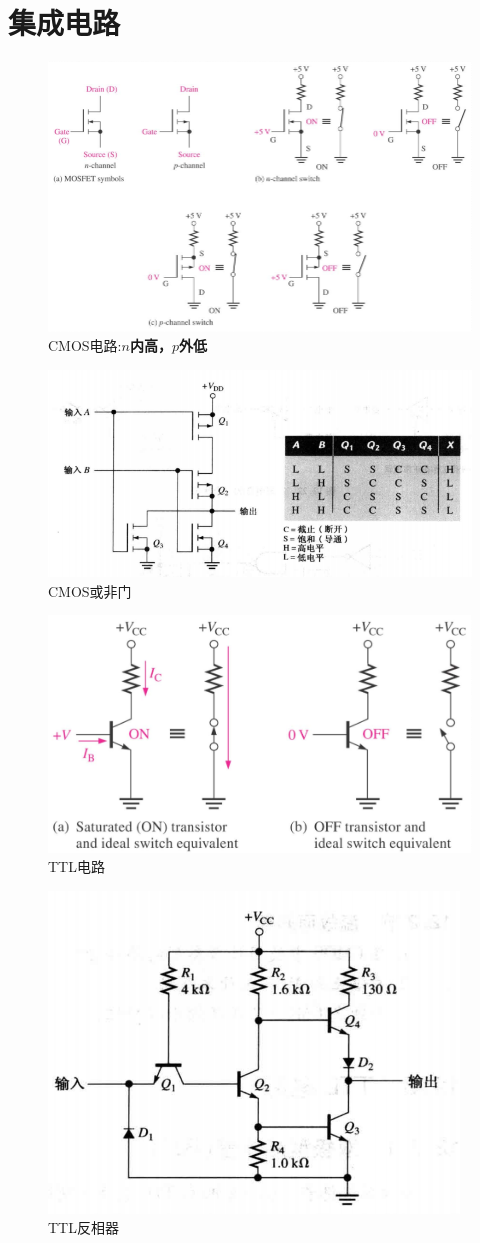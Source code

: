 \section{集成电路}
\begin{figure}[htbp]
	\centering
	\includegraphics[width=0.8\linewidth]{fig/cmos.PNG}
	\caption{CMOS电路:\large\textbf{$n$内高，$p$外低}}
\end{figure}
\begin{figure}[htbp]
	\centering
	\includegraphics[width=0.6\linewidth]{fig/cmos_ex.PNG}
	\caption{CMOS或非门}
\end{figure}
\begin{figure}[htbp]
	\centering
	\includegraphics[width=0.6\linewidth]{fig/ttl.PNG}
	\caption{TTL电路}
\end{figure}
\begin{figure}[htbp]
\label{ttl_inverse}
	\centering
	\includegraphics[width=0.6\linewidth]{fig/ttl_ex.PNG}
	\caption{TTL反相器}
\end{figure}
